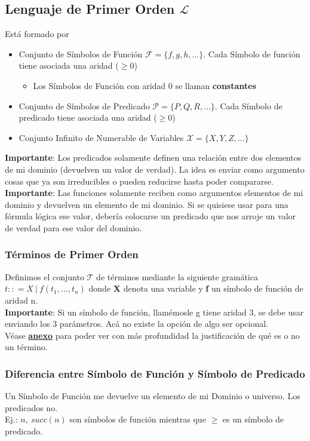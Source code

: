 \documentclass[10pt,a4paper]{article}
\begin{document}
\subsection*{Lenguaje de Primer Orden $\mathcal{L}$}
Está formado por 
\begin{itemize}
    \item Conjunto de Símbolos de Función $\mathcal{F} = \{f, g, h, \dots\}$. Cada Símbolo de función tiene asociada una aridad ($\ge 0$)
    \begin{itemize}
        \item Los Símbolos de Función con aridad 0 se llaman \textbf{constantes}
    \end{itemize}
    \item Conjunto de Símbolos de Predicado $\mathcal{P} = \{P, Q, R, \dots\}$. Cada Símbolo de predicado tiene asociada una aridad ($\ge 0$)
    \item Conjunto Infinito de Numerable de Variables $ \mathcal{X} = \{X, Y, Z, \dots\}$
\end{itemize}
\textbf{Importante}: Los predicados solamente definen una relación entre dos elementos de mi dominio (devuelven un valor de verdad). La idea es enviar como argumento cosas que ya son irreducibles o pueden reducirse hasta poder compararse. \\
\textbf{Importante}: Las funciones solamente reciben como argumentos elementos de mi dominio y devuelven un elemento de mi dominio. Si se quisiese usar para una fórmula lógica ese valor, debería colocarse un predicado que nos arroje un valor de verdad para ese valor del dominio. 
\subsubsection*{Términos de Primer Orden}
Definimos el conjunto $\mathcal{T}$ de términos mediante la siguiente gramática $t :: = X \ | \ f(t_{1}, \dots, t_{n})$ donde \textbf{X} denota una variable y \textbf{f} un símbolo de función de aridad n. \\
\textbf{Importante}: Si un símbolo de función, llamémosle g tiene aridad 3, se debe usar enviando los 3 parámetros. Acá no existe la opción de algo ser opcional. \\
Véase \hyperref[subsec:terminos_lpo]{\textbf{\underline{anexo}}} para poder ver con más profundidad la justificación de qué es o no un término.
\subsubsection*{Diferencia entre Símbolo de Función y Símbolo de Predicado}
Un Símbolo de Función me devuelve un elemento de mi Dominio o universo. Los predicados no. \\
Ej.: $n, \ succ(n)$ son símbolos de función mientras que $\ge$ es un símbolo de predicado. 
\end{document}
